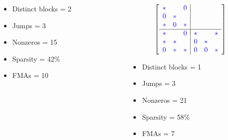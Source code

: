 \documentclass[9pt]{beamer}
\begin{document}
\begin{frame}[fragile]
\begin{columns}[t]
\begin{column}{0.3\textwidth}
        \footnotesize
        \begin{itemize}
          \item Distinct blocks = 2
          \item Jumps = 3
          \item Nonzeros = 15
          \item Sparsity = 42\%
          \item FMAs = 10
        \end{itemize}
    \end{column}
    \begin{column}{0.3\textwidth}
    \[
    \left[
          \begin{array}{ccc|ccc}
          \color{blue}* &   & \color{blue}0 &    &    &    \\
          \color{blue}0 & \color{blue}* &   &    &    &    \\
          \color{blue}* & \color{blue}0 & \color{blue}* &    &    &    \\
          \hline
          \color{blue}* &   & \color{blue}0 & \color{blue}* &   & \color{blue}*  \\
          \color{blue}* & \color{blue}* &   & \color{blue}0 & \color{blue}* &    \\
          \color{blue}0 & \color{blue}* & \color{blue}* & \color{blue}0 & \color{blue}0 & \color{blue}*  \\
          \end{array}
          \right]
      \]
          \footnotesize
          \begin{itemize}
          \item Distinct blocks = 1
          \item Jumps = 3
          \item Nonzeros = 21
          \item Sparsity = 58\%
          \item FMAs = 7
        \end{itemize}
    \end{column}
  \end{columns}

\end{frame}
\end{document}
